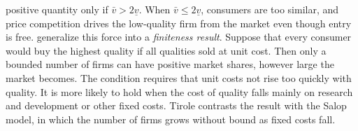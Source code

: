 \begin{remark}
positive quantity only if $\bar v > 2\underline v$. When $\bar v \le 2\underline v$, consumers are too similar,
and price competition drives the low-quality firm from the market even though entry is free. \citet{ShakedSutton1983} generalize this force into a
\emph{finiteness result}. Suppose that every consumer would buy the highest quality if all qualities sold at unit
cost. Then only a bounded number of firms can have positive market shares, however large the market
becomes. The condition requires that unit costs not rise too quickly with quality. It is more likely to hold
when the cost of quality falls mainly on research and development or other fixed costs. Tirole contrasts the result with the Salop model, in which the number of firms grows without bound
as fixed costs fall.
\end{remark}
